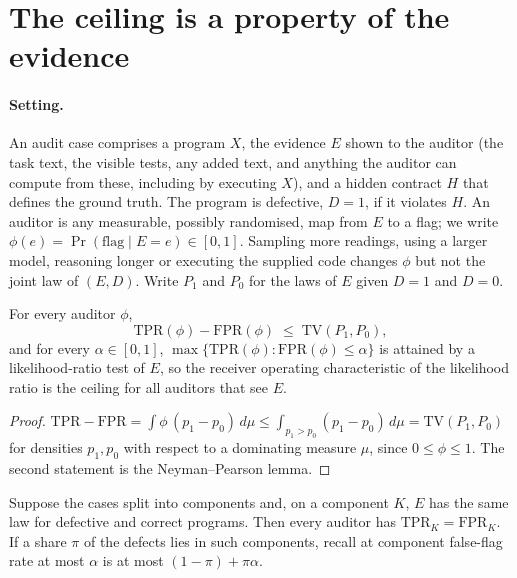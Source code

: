 \section{The ceiling is a property of the evidence}
\label{sec:framework}

\paragraph{Setting.}
An audit case comprises a program $X$, the evidence $E$ shown to the auditor (the task text, the visible tests,
any added text, and anything the auditor can compute from these, including by executing $X$), and a hidden
contract $H$ that defines the ground truth. The program is defective, $D=1$, if it violates $H$. An auditor is any
measurable, possibly randomised, map from $E$ to a flag; we write $\phi(e)=\Pr(\text{flag}\mid E=e)\in[0,1]$.
Sampling more readings, using a larger model, reasoning longer or executing the supplied code changes $\phi$ but not
the joint law of $(E,D)$. Write $P_1$ and $P_0$ for the laws of $E$ given $D=1$ and $D=0$.

\begin{proposition}
\label{prop:ceiling}
For every auditor $\phi$,
\[
\mathrm{TPR}(\phi)-\mathrm{FPR}(\phi)\;\le\;\mathrm{TV}(P_1,P_0),
\]
and for every $\alpha\in[0,1]$, $\max\{\mathrm{TPR}(\phi):\mathrm{FPR}(\phi)\le\alpha\}$ is attained by a
likelihood-ratio test of $E$, so the receiver operating characteristic of the likelihood ratio is the ceiling for
all auditors that see $E$.
\end{proposition}

\begin{proof}
$\mathrm{TPR}-\mathrm{FPR}=\int\phi\,(p_1-p_0)\,d\mu\le\int_{p_1>p_0}(p_1-p_0)\,d\mu=\mathrm{TV}(P_1,P_0)$ for
densities $p_1,p_0$ with respect to a dominating measure $\mu$, since $0\le\phi\le1$. The second statement is the
Neyman--Pearson lemma.
\end{proof}

\begin{corollary}
\label{cor:component}
Suppose the cases split into components and, on a component $K$, $E$ has the same law for defective and correct
programs. Then every auditor has $\mathrm{TPR}_K=\mathrm{FPR}_K$. If a share $\pi$ of the defects lies in such
components, recall at component false-flag rate at most $\alpha$ is at most $(1-\pi)+\pi\alpha$.
\end{corollary}

